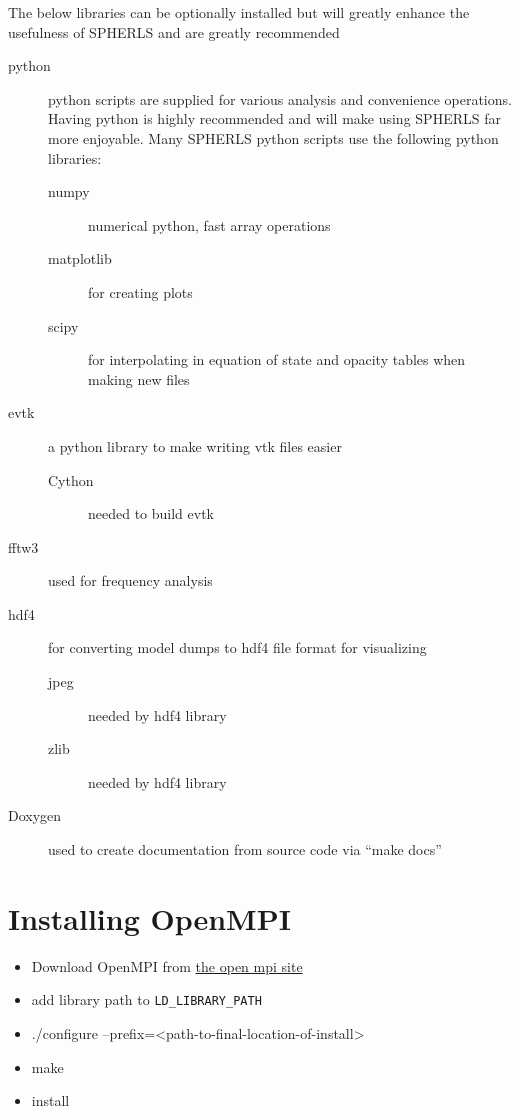 \documentclass[12pt,a4paper]{book}
\begin{document}
The below libraries can be optionally installed but will greatly enhance the usefulness of SPHERLS and are greatly recommended
\begin{description}
\item[python] python scripts are supplied for various analysis and convenience operations. Having python is highly recommended and will make using SPHERLS far more enjoyable. Many SPHERLS python scripts use the following python libraries:
\begin{description}
  \item[numpy] numerical python, fast array operations
  \item[matplotlib] for creating plots
  \item[scipy] for interpolating in equation of state and opacity tables when making new files
\end{description}
\item[evtk] a python library to make writing vtk files easier
\begin{description}
\item[Cython] needed to build evtk
\end{description}
\item[fftw3] used for frequency analysis
\item[hdf4] for converting model dumps to hdf4 file format for visualizing
\begin{description}
  \item[jpeg] needed by hdf4 library
  \item[zlib] needed by hdf4 library
\end{description}
\item[Doxygen] used to create documentation from source code via ``make docs''
\end{description}

\section{Installing OpenMPI}
\begin{itemize}
\item Download OpenMPI from \href{http://www.open-mpi.org/software/ompi/v1.6/}{the open mpi site}
\item add library path to {\tt LD\_LIBRARY\_PATH}
\item ./configure --prefix=<path-to-final-location-of-install>
\item make
\item install
\end{itemize}
\end{document}
